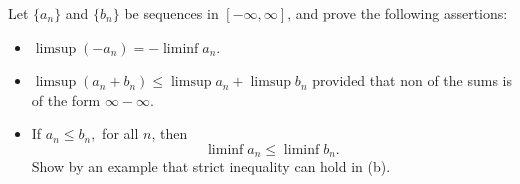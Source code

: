 \documentclass[14.5pt]{article}
\newenvironment{pr}[2][Problem]{\begin{mdframed}[backgroundcolor=gray!10, leftline = false, rightline=false, linewidth=0.25pt]  \begin{trivlist}
\item[\hskip \labelsep {\bfseries #1}\hskip \labelsep {\bfseries #2.}]}{\end{trivlist} \end{mdframed}  }
\begin{document}
\begin{pr}{1.4} Let $\{a_n\}$ and $\{b_n\}$ be sequences in $[-\infty, \infty]$, and prove the following assertions:
\begin{itemize}
    \item[(a)] $\limsup (-a_n) =  - \liminf a_n$.
    \item[(b)] $\limsup (a_n + b_n) \leq \limsup a_n  + \limsup b_n$
    provided that non of the sums is of the form $\infty - \infty$.
    \item[(c)] If $a_n \leq b_n,$ for all $n$, then
    $$\liminf a_n \leq \liminf b_n.$$
    Show by an example that strict inequality can hold in (b).
\end{itemize}
\end{pr}
\end{document}

